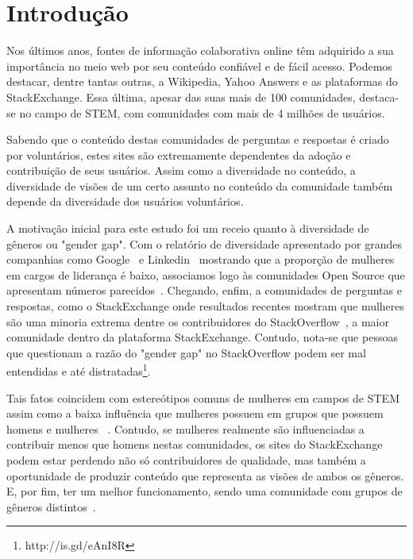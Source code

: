 \chapter{Introdução}
\label{sec:introduction}

Nos últimos anos, fontes de informação colaborativa online têm adquirido a sua importância no meio web por seu conteúdo confiável e de fácil acesso. Podemos destacar, dentre tantas outras, a Wikipedia, Yahoo Answers e as plataformas do StackExchange. Essa última, apesar das suas mais de 100 comunidades, destaca-se no campo de STEM, com comunidades com mais de 4 milhões de usuários. 

Sabendo que o conteúdo destas comunidades de perguntas e respostas é criado por voluntários, estes sites são extremamente dependentes da adoção e contribuição de seus usuários. Assim como a diversidade no conteúdo, a diversidade de visões de um certo assunto no conteúdo da comunidade também depende da diversidade dos usuários voluntários.

A motivação inicial para este estudo foi um receio quanto à diversidade de gêneros ou "gender gap". Com o relatório de diversidade apresentado por grandes companhias como Google~\cite{google:report} e Linkedin~\cite{linkedin:report} mostrando que a proporção de mulheres em cargos de liderança é baixo, associamos logo às comunidades Open Source que apresentam números parecidos~\cite{rustad2011suck}. Chegando, enfim, a comunidades de perguntas e respostas, como o StackExchange onde resultados recentes mostram que mulheres são uma minoria extrema dentre os contribuidores do StackOverflow~\cite{Vasilescu27092013}, a maior comunidade dentro da plataforma StackExchange. Contudo, nota-se que pessoas que questionam a razão do "gender gap" no StackOverflow podem ser mal entendidas e até distratadas\footnote{http://is.gd/eAnI8R}.

Tais fatos coincidem com estereótipos comuns de mulheres em campos de STEM~\cite{spencer1999stereotype} assim como a baixa influência que mulheres possuem em grupos que possuem homens e mulheres ~\cite{karpowitz2012gender}. Contudo, se mulheres realmente são influenciadas a contribuir menos que homens nestas comunidades, os sites do StackExchange podem estar perdendo não só contribuidores de qualidade, mas também a oportunidade de produzir conteúdo que representa as visões de ambos os gêneros. E, por fim, ter um melhor funcionamento, sendo uma comunidade com grupos de gêneros distintos~\cite{marshall1975boys}.

